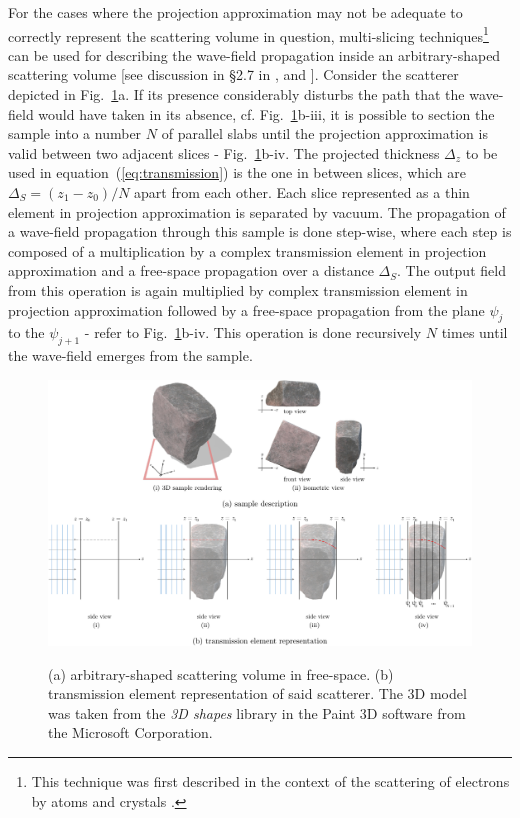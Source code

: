 \documentclass{iucr}              %
\begin{document}
For the cases where the projection approximation may not be adequate to correctly represent the scattering volume in question, multi-slicing techniques\footnote{This technique was first described in the context of the scattering of electrons by atoms and crystals \cite{Cowley1957}.}
can be used for describing the wave-field propagation inside an arbitrary-shaped scattering volume [see discussion in \S2.7 in \cite{paganin_book}, \cite{Li2017} and \cite{Munro2019}]. Consider the scatterer depicted in Fig.~\ref{fig:projection}a. If its presence considerably disturbs the path that the wave-field would have taken in its absence, cf. Fig.~\ref{fig:projection}b-$\mathrm{iii}$, it is possible to section the sample into a number $N$ of parallel slabs until the projection approximation is valid between two adjacent slices - Fig.~\ref{fig:projection}b-$\mathrm{iv}$. The projected thickness $\Delta_z$ to be used in equation~(\ref{eq:transmission}) is the one in  between slices, which are $\Delta_S=(z_1 - z_0)\big/N$ apart from each other. Each slice represented as a thin element in projection approximation is separated by vacuum. The propagation of a wave-field propagation through this sample is done step-wise, where each step is composed of a multiplication by a complex transmission element in projection approximation and a free-space propagation over a distance $\Delta_S$. The output field from this operation is again multiplied by complex transmission element in projection approximation followed by a free-space propagation from the plane $\psi_j$ to the  $\psi_{j+1}$ - refer to Fig.~\ref{fig:projection}b-$\mathrm{iv}$. This operation is done recursively $N$ times until the wave-field emerges from the sample.

\onecolumn
\begin{figure}[]
    \centering
    {\includegraphics[width=0.69\linewidth]{figures/projection_approx.pdf}}
    \caption{(a) arbitrary-shaped scattering volume in free-space. (b) transmission element representation of said scatterer. The 3D model was taken from the \textit{3D shapes} library in the Paint 3D software from the Microsoft Corporation.}
    \label{fig:projection}
\end{figure}
\twocolumn
\end{document}
